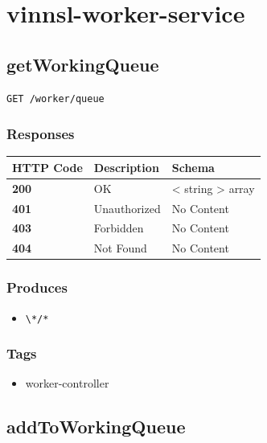 \section{vinnsl-worker-service}\label{vinnsl-worker-service-1}

\subsection{getWorkingQueue}\label{getworkingqueue}

\begin{verbatim}
GET /worker/queue
\end{verbatim}

\subsubsection{Responses}\label{responses-23}

\begin{longtable}[]{@{}lll@{}}
\toprule
HTTP Code & Description & Schema\tabularnewline
\midrule
\endhead
\textbf{200} & OK & \textless{} string \textgreater{}
array\tabularnewline
\textbf{401} & Unauthorized & No Content\tabularnewline
\textbf{403} & Forbidden & No Content\tabularnewline
\textbf{404} & Not Found & No Content\tabularnewline
\bottomrule
\end{longtable}

\subsubsection{Produces}\label{produces-23}

\begin{itemize}
\tightlist
\item
  \texttt{\textbackslash{}*/*}
\end{itemize}

\subsubsection{Tags}\label{tags-23}

\begin{itemize}
\tightlist
\item
  worker-controller
\end{itemize}

\subsection{addToWorkingQueue}\label{addtoworkingqueue}

